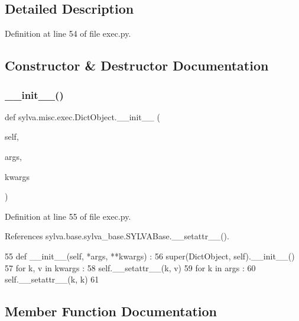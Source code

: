 \subsection{Detailed Description}


Definition at line 54 of file exec.\+py.



\subsection{Constructor \& Destructor Documentation}
\mbox{\label{classsylva_1_1misc_1_1exec_1_1_dict_object_acd7ac78ad80858775f4752edab3bb9f0}} 
\subsubsection{\texorpdfstring{\+\_\+\+\_\+init\+\_\+\+\_\+()}{\_\_init\_\_()}}
{\footnotesize\ttfamily def sylva.\+misc.\+exec.\+Dict\+Object.\+\_\+\+\_\+init\+\_\+\+\_\+ (\begin{DoxyParamCaption}\item[{}]{self,  }\item[{}]{args,  }\item[{}]{kwargs }\end{DoxyParamCaption})}



Definition at line 55 of file exec.\+py.



References sylva.\+base.\+sylva\+\_\+base.\+S\+Y\+L\+V\+A\+Base.\+\_\+\+\_\+setattr\+\_\+\+\_\+().


\begin{DoxyCode}
55   \textcolor{keyword}{def }\_\_init\_\_(self, *args, **kwargs) :
56     super(DictObject, self).\_\_init\_\_()
57     \textcolor{keywordflow}{for} k, v \textcolor{keywordflow}{in} kwargs :
58       self.\_\_setattr\_\_(k, v)
59     \textcolor{keywordflow}{for} k \textcolor{keywordflow}{in} args :
60       self.\_\_setattr\_\_(k, k)
61 
\end{DoxyCode}


\subsection{Member Function Documentation}
\mbox{\label{classsylva_1_1misc_1_1exec_1_1_dict_object_a194306589e55ae82911d017462eb5f8e}} 

